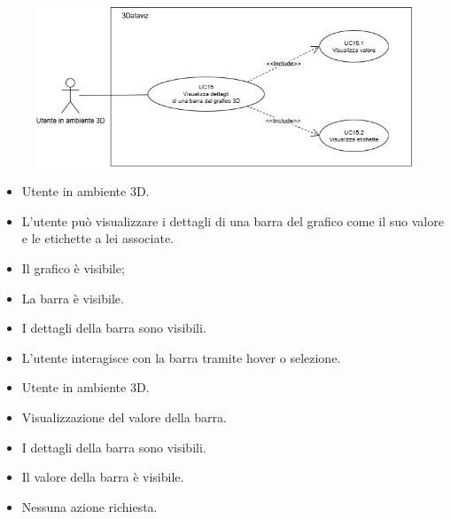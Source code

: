 \begin{figure}[h!]\centering
    \includegraphics[scale=0.7]{template/images/UC15.png}
    \caption{}
\end{figure}
\UCdsc
{ %
    \begin{itemize}
        \item Utente in ambiente 3D.
    \end{itemize}
}
{ %
    \begin{itemize}
        \item L'utente può visualizzare i dettagli di una barra del grafico come il suo valore e le etichette a lei associate.
    \end{itemize}
}
{ %
    \begin{itemize}
        \item Il grafico è visibile;
        \item La barra è visibile.
    \end{itemize}
}
{ %
    \begin{itemize}
        \item I dettagli della barra sono visibili.
    \end{itemize}
}
{ %
    \begin{itemize}
        \item L'utente interagisce con la barra tramite hover o selezione.
    \end{itemize}
}

\UCdsc
{ %
    \begin{itemize}
        \item Utente in ambiente 3D.
    \end{itemize}
}
{ %
    \begin{itemize}
        \item Visualizzazione del valore della barra.
    \end{itemize}
}
{ %
    \begin{itemize}
        \item I dettagli della barra sono visibili.
    \end{itemize}
}
{ %
    \begin{itemize}
        \item Il valore della barra è visibile.
    \end{itemize}
}
{ %
    \begin{itemize}
        \item Nessuna azione richiesta. 
    \end{itemize}
}

